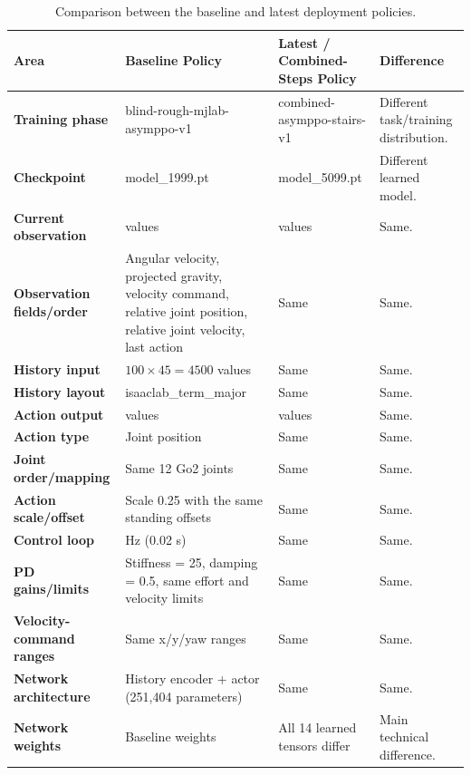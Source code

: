 \documentclass[11pt]{article}
\begin{document}
\begin{table}[ht]
\centering
\caption{Comparison between the baseline and latest deployment policies.}
\label{tab:policy_comparison}

\renewcommand{\arraystretch}{1.25}

\begin{tabularx}{\textwidth}{>{\raggedright\arraybackslash\bfseries}p{3.2cm} >{\raggedright\arraybackslash}p{3.8cm} >{\raggedright\arraybackslash}p{3.8cm} >{\raggedright\arraybackslash}X}
\toprule
\textbf{Area} & \textbf{Baseline Policy} & \textbf{Latest / Combined-Steps Policy} & \textbf{Difference} \\
\midrule

Training phase &
blind-rough-mjlab-asymppo-v1 &
combined-asymppo-stairs-v1 &
Different task/training distribution. \\

Checkpoint &
model\_1999.pt &
model\_5099.pt &
Different learned model. \\

Current observation &
45 values &
45 values &
Same. \\

Observation fields/order &
Angular velocity, projected gravity, velocity command, relative joint position, relative joint velocity, last action &
Same &
Same. \\

History input &
$100 \times 45 = 4500$ values &
Same &
Same. \\

History layout &
isaaclab\_term\_major &
Same &
Same. \\

Action output &
12 values &
12 values &
Same. \\

Action type &
Joint position &
Same &
Same. \\

Joint order/mapping &
Same 12 Go2 joints &
Same &
Same. \\

Action scale/offset &
Scale 0.25 with the same standing offsets &
Same &
Same. \\

Control loop &
50 Hz (0.02 s) &
Same &
Same. \\

PD gains/limits &
Stiffness = 25, damping = 0.5, same effort and velocity limits &
Same &
Same. \\

Velocity-command ranges &
Same x/y/yaw ranges &
Same &
Same. \\

Network architecture &
History encoder + actor (251,404 parameters) &
Same &
Same. \\

Network weights &
Baseline weights &
All 14 learned tensors differ &
Main technical difference. \\

\bottomrule
\end{tabularx}

\end{table}
\end{document}
